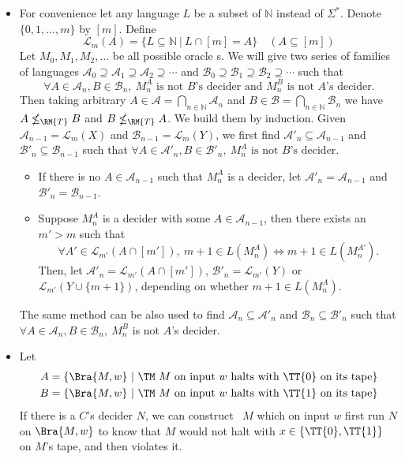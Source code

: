 \begin{itemize}
	\item[\Star 6.16]
	 For convenience let any language $L$ be a subset of $\mathbb{N}$ instead of $\Sigma^*$. Denote $\{0, 1, \dots, m\}$ by $[m]$. Define 
	$$
		\mathcal{L}_m(A) = \{ L \subseteq \mathbb{N} \ | \ L \cap [m] = A\} \quad (A \subseteq [m])
	$$
	Let $M_0, M_1, M_2, \dots$ be all possible oracle \TM s. We will give two series of families of languages $\mathcal{A}_0 \supseteq \mathcal{A}_1 \supseteq \mathcal{A}_2 \supseteq \cdots$ and $\mathcal{B}_0 \supseteq \mathcal{B}_1 \supseteq \mathcal{B}_2 \supseteq \cdots$ such that
	$$
		\forall A \in \mathcal{A}_n, B \in \mathcal{B}_n,\ M_n^A \text{ is not $B$'s decider} \text{ and } M_n^B \text{ is not $A$'s decider}.
	$$
	Then taking arbitrary $A \in \mathcal{A} = \bigcap_{n \in \mathbb{N}} \mathcal{A}_n$ and $B \in \mathcal{B} = \bigcap_{n \in \mathbb{N}} \mathcal{B}_n$ we have $A \nleq_{\RM{T}} B$ and $B \nleq_{\RM{T}} A$. We build them by induction. Given $\mathcal{A}_{n-1} = \mathcal{L}_m(X)$ and $\mathcal{B}_{n-1} = \mathcal{L}_m(Y)$, we first find $\mathcal{A}'_n \subseteq \mathcal{A}_{n-1}$ and $\mathcal{B}'_n \subseteq \mathcal{B}_{n-1}$ such that $\forall A \in \mathcal{A}'_n, B \in \mathcal{B}'_n,\ M_n^A \text{ is not $B$'s decider}$.
	\begin{itemize}
		\item If there is no $A \in \mathcal{A}_{n-1}$ such that $M_n^A$ is a decider, let $\mathcal{A}'_n = \mathcal{A}_{n-1}$ and $\mathcal{B}'_n = \mathcal{B}_{n-1}$.
		\item Suppose $M_n^A$ is a decider with some $A \in \mathcal{A}_{n-1}$, then there exists an $m'>m$ such that 
		$$
			\forall A' \in \mathcal{L}_{m'}(A \cap [m']),\ m+1 \in L(M_n^A) \iff m+1 \in L(M_n^{A'}).
		$$
		Then, let $\mathcal{A}'_n = \mathcal{L}_{m'}(A \cap [m'])$, $\mathcal{B}'_n = \mathcal{L}_{m'}(Y)$ or $\mathcal{L}_{m'}(Y \cup \{m+1\})$, depending on whether $m+1 \in L(M_n^A)$.
	\end{itemize}
	The same method can be also used to find $\mathcal{A}_n \subseteq \mathcal{A}'_{n}$ and $\mathcal{B}_n \subseteq \mathcal{B}'_{n}$ such that $\forall A \in \mathcal{A}_n, B \in \mathcal{B}_n,\ M_n^B $ is not $A$'s decider.
	
	\item[\Star 6.17]
	Let 
	\begin{align*}
		A = \{ \Bra{M, w} \ | \ \text{\TM\ $M$ on input $w$ halts with \TT{0} on its tape} \} \\
		B = \{ \Bra{M, w} \ | \ \text{\TM\ $M$ on input $w$ halts with \TT{1} on its tape} \}
	\end{align*}
	If there is a $C$'s decider $N$, we can construct \TM\ $M$ which on input $w$ first run $N$ on $\Bra{M, w}$ to know that $M$ would not halt with $x \in \{ \TT{0}, \TT{1} \}$ on $M$'s tape, and then violates it.
	

\end{itemize}
